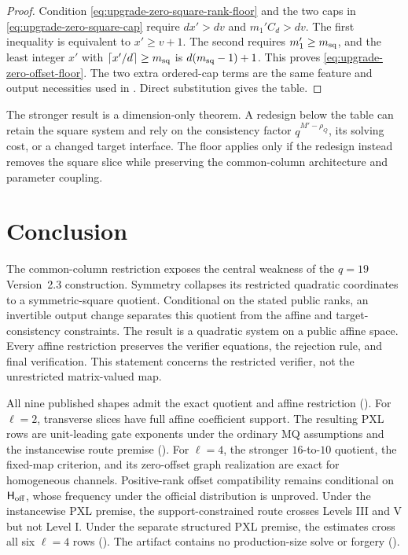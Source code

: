 \documentclass[11pt]{article}
\begin{document}
\begin{proof}
Condition \eqref{eq:upgrade-zero-square-rank-floor} and the two caps in
\eqref{eq:upgrade-zero-square-cap} require
$dx'>dv$ and $m_1'C_d>dv$.  The first inequality is equivalent to
$x'\ge v+1$.  The second requires $m_1'\ge m_{\rm sq}$, and the least integer
$x'$ with $\lceil x'/d\rceil\ge m_{\rm sq}$ is
$d(m_{\rm sq}-1)+1$.  This proves
\eqref{eq:upgrade-zero-offset-floor}.  The two extra ordered-cap terms are
the same feature and output necessities used in
.  Direct substitution gives the table.
\end{proof}

The stronger result is a dimension-only theorem.  A redesign below the table
can retain the square system and rely on the consistency factor
$q^{M'-\rho_Q}$, its solving cost, or a changed target interface.  The floor
applies only if the redesign instead removes the square slice while preserving
the common-column architecture and parameter coupling.

\section{Conclusion}\label{sec:conclusion}
The common-column restriction exposes the central weakness of the $q=19$
Version~2.3 construction.  Symmetry collapses its restricted quadratic
coordinates to a symmetric-square quotient.  Conditional on the stated public
ranks, an invertible output change separates this quotient from the affine and
target-consistency constraints.  The result is a quadratic system on a public
affine space.  Every affine restriction preserves the verifier equations, the
rejection rule, and final verification.
This statement concerns the restricted verifier, not the unrestricted
matrix-valued map.

All nine published shapes admit the exact quotient and affine restriction
().  For $\ell=2$, transverse slices have
full affine coefficient support.  The resulting PXL rows are unit-leading
gate exponents under the ordinary MQ assumptions and the instancewise route
premise ().  For $\ell=4$, the stronger
$16$-to-$10$
quotient, the fixed-map criterion, and its zero-offset graph realization are
exact for homogeneous channels.  Positive-rank offset compatibility remains
conditional on $\mathsf H_{\rm off}$, whose frequency under the official
distribution is unproved.  Under the instancewise PXL premise, the
support-constrained route crosses Levels III and V but not Level I.  Under the
separate structured PXL premise, the estimates cross all six $\ell=4$ rows
().  The
artifact contains no production-size solve or forgery
().
\end{document}
